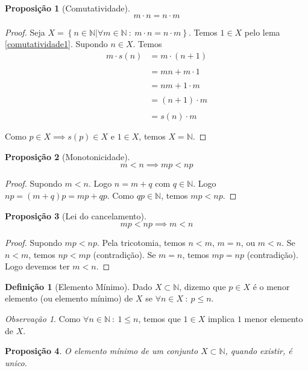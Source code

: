 \documentclass{article}
\newtheorem{prop}{Proposição}[section]
\theoremstyle{theorem}
\theoremstyle{lemma}
\theoremstyle{definition}
\newtheorem{definicao}{Definição}[section]
\theoremstyle{remark}
\newtheorem{obs}{Observação}[section]
\begin{document}
\begin{prop}[Comutatividade]
	$$m\cdot n = n \cdot m $$
\end{prop}
\begin{proof}
	Seja $X = \left\{n \in \mathbb{N} | \forall m \in \mathbb{N} \: : \:  m\cdot n = n\cdot m  \right\}$. Temos $1\in X$ pelo lema \ref{comutatividade1}. Supondo $n\in X$. Temos 
	 \begin{align*}
		 m\cdot s(n) &= m\cdot(n +1 )  \\~\\
		 &=mn + m\cdot1 \\~\\
		 &=nm + 1\cdot m \\~\\
		 &=(n+1)\cdot m  \\~\\
		 &=s(n)\cdot m \\~\\
	\end{align*}
	Como $p\in X\implies s(p) \in X $ e $1\in X$, temos $X = \mathbb{N}$.
\end{proof}
\begin{prop}[Monotonicidade]
	$$ m< n \implies  mp < np $$
\end{prop}
\begin{proof}
	Supondo $m<n$. Logo $n = m+q$ com $q\in \mathbb{N}$. Logo $np = (m+q)p = mp +qp$. Como $qp\in \mathbb{N}$, temos $mp < np$.
\end{proof}
\begin{prop}[Lei do cancelamento]
	$$ mp < np \implies  m < n $$
\end{prop}
\begin{proof}
	Supondo $mp < np$. Pela tricotomia, temos  $n<m$, $m=n$, ou $m < n$. Se $n<m$, temos $np < mp$ (contradição). Se $m = n$, temos $mp = np$ (contradição). Logo devemos ter $m <n$.

\end{proof}
\begin{definicao}[Elemento Mínimo]
	Dado $X\subset \mathbb{N}$, dizemo que $p\in X$ é o menor elemento (ou elemento mínimo) de $X$ se $\forall n\in X \: : \: p\leq n$.
\end{definicao}
\begin{obs}
	Como $\forall n\in \mathbb{N} \: : \: 1 \leq n$, temos que $1\in X$ implica $1$ menor elemento de $X$.
\end{obs}
\begin{prop}
	O elemento mínimo de um conjunto $X\subset \mathbb{N}$, quando existir, é unico.
\end{prop}
\end{document}
